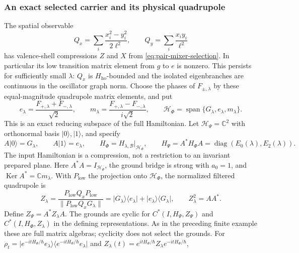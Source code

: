 \documentclass[11pt,reqno]{scrartcl}
\newcommand{\CC}{\mathbb C}
\newcommand{\scrHP}{\mathscr H_{\Psi}}
\newcommand{\scrHF}{\mathscr H_{\Phi}}
\newcommand{\ket}[1]{\lvert #1\rangle}
\newcommand{\bra}[1]{\langle #1\rvert}
\newcommand{\proj}[1]{\ket{#1}\!\bra{#1}}
\DeclareMathOperator{\Ker}{Ker}
\DeclareMathOperator{\diag}{diag}
\DeclareMathOperator{\Span}{span}
\theoremstyle{plain}
\theoremstyle{definition}
\theoremstyle{remark}
\begin{document}
\subsubsection*{An exact selected carrier and its physical quadrupole}
The spatial observable
\begin{equation}
 Q_x=\sum_i\frac{x_i^2-y_i^2}{2\ell^2},\qquad
 Q_y=\sum_i\frac{x_iy_i}{\ell^2}
 \label{eq:orbital-quadrupoles}
\end{equation}
has valence-shell compressions \(Z\) and \(X\) from
\cref{eq:pair-mixer-selection}.  In particular its low transition matrix
element from \(g\) to \(e\) is nonzero.  This persists for sufficiently
small \(\lambda\): $Q_x$ is $H_{\mathrm{ho}}$-bounded and the
isolated eigenbranches are continuous in the oscillator graph norm.  Choose the phases of \(F_{\pm,\lambda}\) by these
equal-magnitude quadrupole matrix elements, and put
\begin{equation}
 e_\lambda=\frac{F_{+,\lambda}+F_{-,\lambda}}{\sqrt2},\qquad
 m_\lambda=\frac{F_{+,\lambda}-F_{-,\lambda}}{i\sqrt2},\qquad
 \scrHF=\Span\{G_\lambda,e_\lambda,m_\lambda\}.
 \label{eq:orbital-low-carrier}
\end{equation}
This is an exact reducing subspace of the full Hamiltonian.  Let
\(\scrHP=\CC^2\) with orthonormal basis \(\ket0,\ket1\), and specify
\begin{equation}
 A\ket0=G_\lambda,\qquad A\ket1=e_\lambda,\qquad
 H_\Phi=H_{\lambda,\mathcal B}|_{\scrHF},\qquad
 H_\Psi=A^*H_\Phi A=\diag(E_0(\lambda),E_2(\lambda)).
 \label{eq:orbital-typed-preparation}
\end{equation}
The input Hamiltonian is a compression, not a restriction to an invariant
prepared plane.  Here \(A^*A=I_{\scrHP}\), the ground bridge is strong with
\(a_0=1\), and \(\Ker A^*=\CC m_\lambda\).  With \(P_{\mathrm{low}}\)
the projection onto \(\scrHF\), the normalized filtered quadrupole is
\begin{equation}
 Z_\lambda=
 \frac{P_{\mathrm{low}}Q_xP_{\mathrm{low}}}
 {\|P_{\mathrm{low}}Q_xG_\lambda\|}
 =\ket{G_\lambda}\!\bra{e_\lambda}
  +\ket{e_\lambda}\!\bra{G_\lambda},
 \qquad Z_\lambda^2=AA^*.
 \label{eq:orbital-filtered-readout}
\end{equation}
Define $Z_\Psi=A^*Z_\lambda A$.  The grounds are cyclic for
$C^*(I,H_\Psi,Z_\Psi)$ and $C^*(I,H_\Phi,Z_\lambda)$ in the
defining representations.  As in the preceding
finite example these are full matrix algebras; cyclicity does not select
the grounds.  For $\rho_t=\proj{e^{-itH_\Phi/\hbar}e_\lambda}$
and $Z_\lambda(t)=e^{itH_\Phi/\hbar}Z_\lambda e^{-itH_\Phi/\hbar}$,
\end{document}
